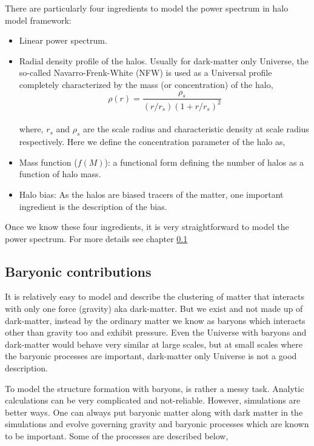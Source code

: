 There are particularly four ingredients to model the power spectrum in halo model framework:

\begin{itemize}
	\item Linear power spectrum.

	\item Radial density profile of the halos. Usually for dark-matter only Universe, the so-called
			Navarro-Frenk-White (NFW) is used as a Universal profile completely characterized by the
			mass (or concentration) of the halo,
			\begin{equation}
				\rho(r) = \dfrac{\rho_s}{(r/r_s)(1+r/r_s)^2}
			\end{equation}
			\\
			where, $r_s$ and $\rho_s$ are the scale radius and characteristic density at scale radius
			respectively. Here we define the concentration parameter of the halo as,

	\item Mass function ($f(M)$): a functional form defining the number of halos as a function of halo
			mass. 

	\item Halo bias: As the halos are biased tracers of the matter, one important ingredient is 
			the description of the bias.  
\end{itemize}

Once we know these four ingredients, it is very straightforward to model the power spectrum. For 
more details see chapter \ref{}

\subsection{Baryonic contributions}
It is relatively easy to model and describe the clustering of matter that interacts with only 
one force (gravity) aka dark-matter. But we exist and not made up of dark-matter, instead by the
ordinary matter we know as baryons which interacts other than gravity too and exhibit pressure. 
Even the Universe with baryons and dark-matter would behave very similar at large scales,
but at small scales where the baryonic processes are important, dark-matter only Universe is
not a good description. 

To model the structure formation with baryons, is rather a messy task. Analytic calculations
can be very complicated and not-reliable. However, simulations are better ways. One can always
put baryonic matter along with dark matter in the simulations and evolve governing gravity and
baryonic processes which are known to be important. Some of the processes are described below,

